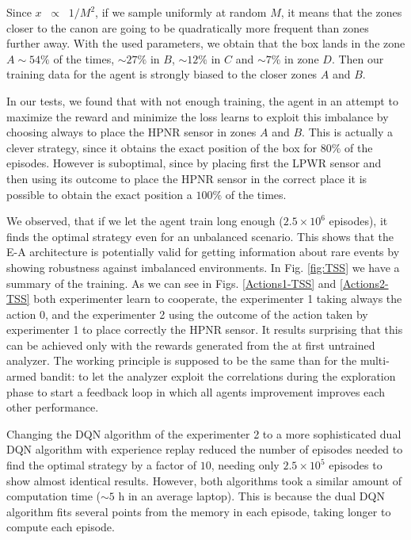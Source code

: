 \documentclass[11pt,a4paper,twoside]{report}
\newcommand{\+}{\textnormal{+} }
\theoremstyle{definition}
\numberwithin{equation}{chapter}
\begin{document}
Since $x\;\;\propto \;\;1/M^2$, if we sample uniformly at random $M$, it means
that the zones closer to the canon are going to be quadratically more frequent
than zones further away. With the used parameters, we obtain that the box lands
in the zone $A\sim54\%$ of the times, $\sim27\%$ in $B$, $\sim 12\%$ in
$C$ and $\sim7\%$ in zone $D$. Then our training data for the agent is 
strongly biased to the closer zones $A$ and $B$.

In our tests, we found that with not enough training, the agent in an attempt 
to maximize the reward and minimize the loss learns to exploit this imbalance by
choosing always to place the HPNR sensor in zones $A$ and $B$. This is actually
a clever strategy, since it obtains the exact position of the box for $80\%$ of
the episodes. However is suboptimal, since by placing first the LPWR sensor and
then using its outcome to place the HPNR sensor in the correct place it is
possible to obtain the exact position a $100\%$ of the times.

We observed, that if we let the agent train long enough ($2.5\times 10^6$
episodes), it finds the optimal strategy even for an unbalanced scenario. This
shows that the E-A architecture is potentially valid for getting information
about rare events by showing robustness against imbalanced environments. In Fig.
\ref{fig:TSS} we have a summary of the training. As we can see in Figs.
\ref{Actions1-TSS} and \ref{Actions2-TSS} both experimenter learn to cooperate,
the experimenter 1 taking always the action 0, and the experimenter 2 using the
outcome of the action taken by experimenter 1 to place correctly the HPNR
sensor. It results surprising that this can be achieved only with the rewards
generated from the at first untrained analyzer. The working principle is
supposed to be the same than for the multi-armed bandit: to let the analyzer
exploit the correlations during the exploration phase to start a feedback loop
in which all agents improvement improves each other performance.

Changing the DQN algorithm of the experimenter 2 to a more sophisticated dual
DQN algorithm with experience replay reduced the number of episodes needed to
find the optimal strategy by a factor of $10$, needing only $2.5\times10^5$
episodes to show almost identical results. However, both algorithms took a
similar amount of computation time ($\sim 5$ h in an average laptop). This is
because the dual DQN algorithm fits several points from the memory in each
episode, taking longer to compute each episode.
\end{document}
